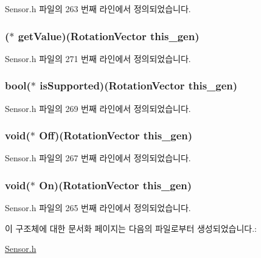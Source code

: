 Sensor.\-h 파일의 263 번째 라인에서 정의되었습니다.

\hypertarget{struct___rotation_vector_ac37bd4354c04172e326f5c6f86580785}{
\subsubsection[{get\-Value}]{($\ast$  get\-Value)({\bf Rotation\-Vector} this\-\_\-gen)}}\label{struct___rotation_vector_ac37bd4354c04172e326f5c6f86580785}


Sensor.\-h 파일의 271 번째 라인에서 정의되었습니다.

\hypertarget{struct___rotation_vector_a6064cf9c8ed8eeb39afea3993119d471}{
\subsubsection[{is\-Supported}]{\setlength{\rightskip}{0pt plus 5cm}bool($\ast$  is\-Supported)({\bf Rotation\-Vector} this\-\_\-gen)}}\label{struct___rotation_vector_a6064cf9c8ed8eeb39afea3993119d471}


Sensor.\-h 파일의 269 번째 라인에서 정의되었습니다.

\hypertarget{struct___rotation_vector_ab4af77a4f32af8d4001b111cb630c1e6}{
\subsubsection[{Off}]{\setlength{\rightskip}{0pt plus 5cm}void($\ast$  Off)({\bf Rotation\-Vector} this\-\_\-gen)}}\label{struct___rotation_vector_ab4af77a4f32af8d4001b111cb630c1e6}


Sensor.\-h 파일의 267 번째 라인에서 정의되었습니다.

\hypertarget{struct___rotation_vector_a4b696cbf05ce516ce608cb1ac70dbcc3}{
\subsubsection[{On}]{\setlength{\rightskip}{0pt plus 5cm}void($\ast$  On)({\bf Rotation\-Vector} this\-\_\-gen)}}\label{struct___rotation_vector_a4b696cbf05ce516ce608cb1ac70dbcc3}


Sensor.\-h 파일의 265 번째 라인에서 정의되었습니다.



이 구조체에 대한 문서화 페이지는 다음의 파일로부터 생성되었습니다.\-:\begin{DoxyCompactItemize}
\item 
\hyperlink{_sensor_8h}{Sensor.\-h}\end{DoxyCompactItemize}
